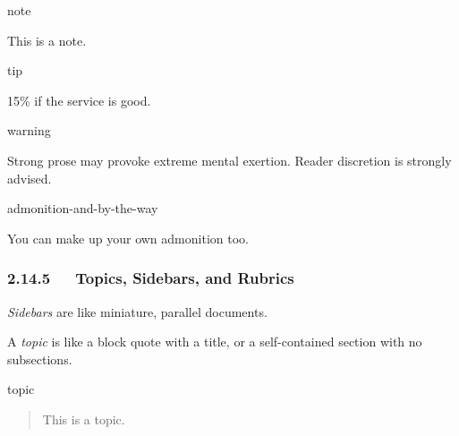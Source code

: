 \documentclass[a4paper]{article}
\begin{document}
\begin{DUclass}{note}
\begin{DUadmonition}

This is a note.
\end{DUadmonition}
\end{DUclass}

\begin{DUclass}{tip}
\begin{DUadmonition}

15\% if the service is good.
\end{DUadmonition}
\end{DUclass}

\begin{DUclass}{warning}
\begin{DUadmonition}

Strong prose may provoke extreme mental exertion.
Reader discretion is strongly advised.
\end{DUadmonition}
\end{DUclass}

\begin{DUclass}{admonition-and-by-the-way}
\begin{DUadmonition}

You can make up your own admonition too.
\end{DUadmonition}
\end{DUclass}


\subsubsection{2.14.5   Topics, Sidebars, and Rubrics%
  \label{topics-sidebars-and-rubrics}%
}

\emph{Sidebars} are like miniature, parallel documents.


A \emph{topic} is like a block quote with a title, or a self-contained section
with no subsections.

\begin{DUclass}{topic}
\begin{quote}

This is a topic.
\end{quote}
\end{DUclass}
\end{document}
